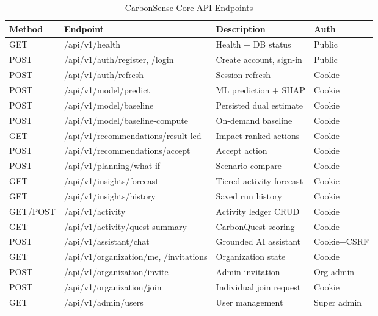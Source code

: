 \documentclass[conference]{IEEEtran}
\begin{document}
\FloatBarrier
\begin{table}[!t]
\caption{CarbonSense Core API Endpoints}
\label{tab:api}
\centering
\footnotesize
\begin{tabular}{@{}llll@{}}
\toprule
\textbf{Method} & \textbf{Endpoint} & \textbf{Description} & \textbf{Auth} \\
\midrule
GET  & /api/v1/health & Health + DB status & Public \\
POST & /api/v1/auth/register, /login & Create account, sign-in & Public \\
POST & /api/v1/auth/refresh & Session refresh & Cookie \\
POST & /api/v1/model/predict & ML prediction + SHAP & Cookie \\
POST & /api/v1/model/baseline & Persisted dual estimate & Cookie \\
POST & /api/v1/model/baseline-compute & On-demand baseline & Cookie \\
GET  & /api/v1/recommendations/result-led & Impact-ranked actions & Cookie \\
POST & /api/v1/recommendations/accept & Accept action & Cookie \\
POST & /api/v1/planning/what-if & Scenario compare & Cookie \\
GET  & /api/v1/insights/forecast & Tiered activity forecast & Cookie \\
GET  & /api/v1/insights/history & Saved run history & Cookie \\
GET/POST & /api/v1/activity & Activity ledger CRUD & Cookie \\
GET  & /api/v1/activity/quest-summary & CarbonQuest scoring & Cookie \\
POST & /api/v1/assistant/chat & Grounded AI assistant & Cookie+CSRF \\
GET  & /api/v1/organization/me, /invitations & Organization state & Cookie \\
POST & /api/v1/organization/invite & Admin invitation & Org admin \\
POST & /api/v1/organization/join & Individual join request & Cookie \\
GET  & /api/v1/admin/users & User management & Super admin \\
\bottomrule
\end{tabular}
\end{table}

\FloatBarrier
\end{document}
